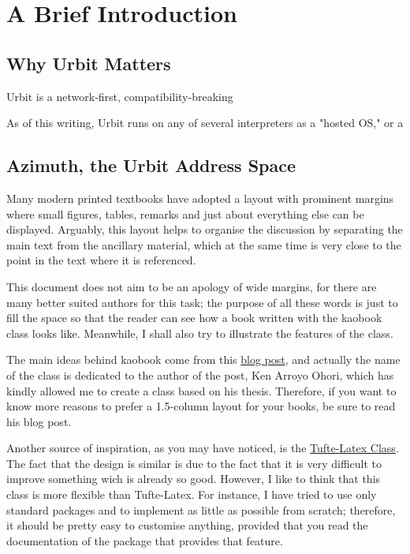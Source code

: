 \setchapterpreamble[u]{\margintoc}
\chapter{A Brief Introduction}


\section{Why Urbit Matters}

Urbit is a  network-first,
compatibility-breaking

As of this writing, Urbit runs on any of several interpreters as a "hosted OS," or a



\section{Azimuth, the Urbit Address Space}

Many modern printed textbooks have adopted a layout with prominent
margins where small figures, tables, remarks and just about everything
else can be displayed. Arguably, this layout helps to organise the
	discussion by separating the main text from the ancillary material,
	which at the same time is very close to the point in the text where
	it is referenced.

This document does not aim to be an apology of wide margins, for there
are many better suited authors for this task; the purpose of all these
words is just to fill the space so that the reader can see how a book
written with the kaobook class looks like. Meanwhile, I shall also try
to illustrate the features of the class.

The main ideas behind kaobook come from this
\href{https://3d.bk.tudelft.nl/ken/en/2016/04/17/a-1.5-column-layout-in-latex.html}{blog
	post}, and actually the name of the class is dedicated to the author
of the post, Ken Arroyo Ohori, which has kindly allowed me to create a
class based on his thesis. Therefore, if you want to know more reasons
to prefer a 1.5-column layout for your books, be sure to read his blog
post.

Another source of inspiration, as you may have noticed, is the
\href{https://github.com/Tufte-LaTeX/tufte-latex}{Tufte-Latex Class}.
The fact that the design is similar is due to the fact that it is very
difficult to improve something wich is already so good. However, I like
to think that this class is more flexible than Tufte-Latex. For
instance, I have tried to use only standard packages and to implement as
little as possible from scratch; therefore, it should be pretty easy
to customise anything, provided that you read the documentation of the
package that provides that feature.

